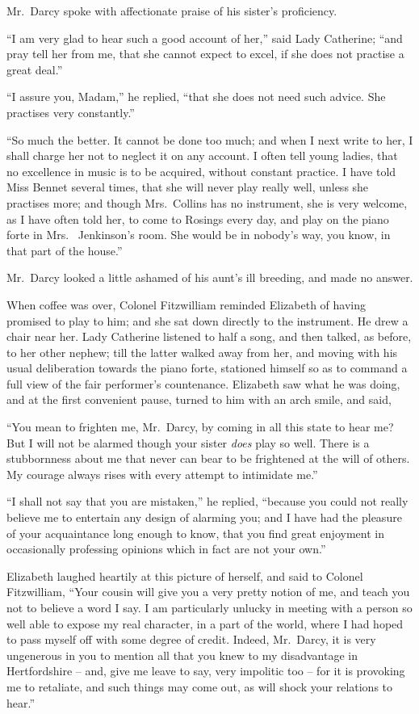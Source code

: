 Mr.\ Darcy spoke with affectionate praise of his sister’s
proficiency.

“I am very glad to hear such a good account of her,”
said Lady Catherine; “and pray tell her from me, that
she cannot expect to excel, if she does not practise a great
deal.”

“I assure you, Madam,” he replied, “that she does
not need such advice. She practises very constantly.”

“So much the better. It cannot be done too much;
and when I next write to her, I shall charge her not to
neglect it on any account. I often tell young ladies,
that no excellence in music is to be acquired, without
constant practice. I have told Miss Bennet several times,
that she will never play really well, unless she practises
more; and though Mrs.\ Collins has no instrument, she
is very welcome, as I have often told her, to come to
Rosings every day, and play on the piano forte in Mrs.\ %
Jenkinson’s room. She would be in nobody’s way, you
know, in that part of the house.”

Mr.\ Darcy looked a little ashamed of his aunt’s ill
breeding, and made no answer.

When coffee was over, Colonel Fitzwilliam reminded
Elizabeth of having promised to play to him; and she
sat down directly to the instrument. He drew a chair
near her. Lady Catherine listened to half a song, and
then talked, as before, to her other nephew; till the
latter walked away from her, and moving with his usual
deliberation towards the piano forte, stationed himself so
as to command a full view of the fair performer’s countenance.
Elizabeth saw what he was doing, and at the
first convenient pause, turned to him with an arch smile,
and said,

“You mean to frighten me, Mr.\ Darcy, by coming in
all this state to hear me? But I will not be alarmed
though your sister \textit{does} play so well. There is a stubbornness
about me that never can bear to be frightened at
the will of others. My courage always rises with every
attempt to intimidate me.”

“I shall not say that you are mistaken,” he replied,
“because you could not really believe me to entertain
any design of alarming you; and I have had the pleasure
of your acquaintance long enough to know, that you find
great enjoyment in occasionally professing opinions which
in fact are not your own.”

Elizabeth laughed heartily at this picture of herself,
and said to Colonel Fitzwilliam, “Your cousin will give
you a very pretty notion of me, and teach you not to
believe a word I say. I am particularly unlucky in meeting
with a person so well able to expose my real character,
in a part of the world, where I had hoped to pass myself
off with some degree of credit. Indeed, Mr.\ Darcy, it is
very ungenerous in you to mention all that you knew to
my disadvantage in Hertfordshire -- and, give me leave
to say, very impolitic too -- for it is provoking me to
retaliate, and such things may come out, as will shock
your relations to hear.”

